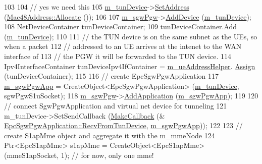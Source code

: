 \begin{DoxyCode}
103 
104   \textcolor{comment}{// yes we need this}
105   \hyperlink{classns3_1_1MmWavePointToPointEpcHelper_acdac8e4f1564927bfe05c2a04511394b}{m\_tunDevice}->\hyperlink{classns3_1_1VirtualNetDevice_a560887abe97f9327f2973d748aa382e9}{SetAddress} (\hyperlink{classns3_1_1Mac48Address_a203b53c035649c0d4881fa1115aa2cdb}{Mac48Address::Allocate} ()); 
106 
107   \hyperlink{classns3_1_1MmWavePointToPointEpcHelper_a164b7ce64e19868995296d492e7ddd21}{m\_sgwPgw}->\hyperlink{classns3_1_1Node_a42ff83ee1d5d1649c770d3f5b62375de}{AddDevice} (\hyperlink{classns3_1_1MmWavePointToPointEpcHelper_acdac8e4f1564927bfe05c2a04511394b}{m\_tunDevice});
108   NetDeviceContainer tunDeviceContainer;
109   tunDeviceContainer.Add (\hyperlink{classns3_1_1MmWavePointToPointEpcHelper_acdac8e4f1564927bfe05c2a04511394b}{m\_tunDevice});
110   
111   \textcolor{comment}{// the TUN device is on the same subnet as the UEs, so when a packet}
112   \textcolor{comment}{// addressed to an UE arrives at the intenet to the WAN interface of}
113   \textcolor{comment}{// the PGW it will be forwarded to the TUN device. }
114   Ipv4InterfaceContainer tunDeviceIpv4IfContainer = \hyperlink{classns3_1_1MmWavePointToPointEpcHelper_aac0f6361775ae1a148c4faec26f58fc6}{m\_ueAddressHelper}.
      \hyperlink{classns3_1_1Ipv4AddressHelper_af8e7f4a1a7e74c00014a1eac445a27af}{Assign} (tunDeviceContainer);  
115 
116   \textcolor{comment}{// create EpcSgwPgwApplication}
117   \hyperlink{classns3_1_1MmWavePointToPointEpcHelper_a91427a039a393a8e4faaf4d08813d929}{m\_sgwPgwApp} = CreateObject<EpcSgwPgwApplication> (\hyperlink{classns3_1_1MmWavePointToPointEpcHelper_acdac8e4f1564927bfe05c2a04511394b}{m\_tunDevice}, sgwPgwS1uSocket);
118   \hyperlink{classns3_1_1MmWavePointToPointEpcHelper_a164b7ce64e19868995296d492e7ddd21}{m\_sgwPgw}->\hyperlink{classns3_1_1Node_ab98b4fdc4aadc86366b80e8a79a53f47}{AddApplication} (\hyperlink{classns3_1_1MmWavePointToPointEpcHelper_a91427a039a393a8e4faaf4d08813d929}{m\_sgwPgwApp});
119   
120   \textcolor{comment}{// connect SgwPgwApplication and virtual net device for tunneling}
121   m\_tunDevice->SetSendCallback (\hyperlink{group__makecallbackmemptr_ga9376283685aa99d204048d6a4b7610a4}{MakeCallback} (&
      \hyperlink{classns3_1_1EpcSgwPgwApplication_aeea285ccd04a4350e4ddb77a359e97ca}{EpcSgwPgwApplication::RecvFromTunDevice}, 
      \hyperlink{classns3_1_1MmWavePointToPointEpcHelper_a91427a039a393a8e4faaf4d08813d929}{m\_sgwPgwApp}));
122 
123  \textcolor{comment}{// create S1apMme object and aggregate it with the m\_mmeNode}
124   Ptr<EpcS1apMme> s1apMme = CreateObject<EpcS1apMme> (mmeS1apSocket, 1); \textcolor{comment}{// for now, only one mme!}

\end{DoxyCode}
